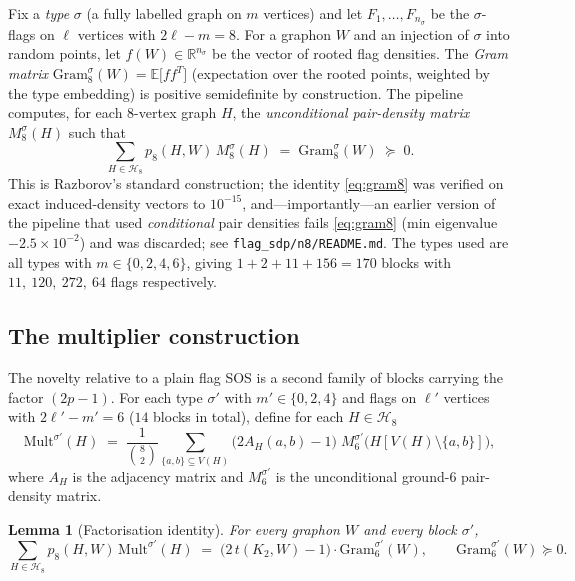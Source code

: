 \documentclass[11pt]{article}
\newtheorem{lemma}[theorem]{Lemma}
\theoremstyle{definition}
\newcommand{\R}{\mathbb R}
\newcommand{\E}{\mathbb E}
\begin{document}
Fix a \emph{type} $\sigma$ (a fully labelled graph on $m$ vertices) and let
$F_1,\dots,F_{n_\sigma}$ be the $\sigma$-flags on $\ell$ vertices with
$2\ell-m=8$.  For a graphon $W$ and an injection of $\sigma$ into random
points, let $f(W)\in\R^{n_\sigma}$ be the vector of rooted flag densities.
The \emph{Gram matrix} $\mathrm{Gram}_8^\sigma(W)=\E\big[f f^{T}\big]$
(expectation over the rooted points, weighted by the type embedding) is
positive semidefinite by construction.  The pipeline computes, for each
$8$-vertex graph $H$, the \emph{unconditional pair-density matrix}
$M^\sigma_8(H)$ such that
\begin{equation}\label{eq:gram8}
  \sum_{H\in\mathcal H_8}p_8(H,W)\,M^\sigma_8(H)\;=\;\mathrm{Gram}_8^\sigma(W)
  \;\succeq\;0 .
\end{equation}
This is Razborov's standard construction; the identity \eqref{eq:gram8} was
verified on exact induced-density vectors to $10^{-15}$, and---importantly---an
earlier version of the pipeline that used \emph{conditional} pair densities
fails \eqref{eq:gram8} (min eigenvalue $-2.5\times10^{-2}$) and was discarded;
see \texttt{flag\_sdp/n8/README.md}.  The types used are all types with
$m\in\{0,2,4,6\}$, giving $1+2+11+156=170$ blocks with
$11,\ 120,\ 272,\ 64$ flags respectively.

\subsection{The multiplier construction}\label{sec:mult}

The novelty relative to a plain flag SOS is a second family of blocks carrying
the factor $(2p-1)$.  For each type $\sigma'$ with $m'\in\{0,2,4\}$ and flags
on $\ell'$ vertices with $2\ell'-m'=6$ ($14$ blocks in total), define for each
$H\in\mathcal H_8$
\begin{equation}\label{eq:multdef}
  \mathrm{Mult}^{\sigma'}(H)\;=\;\frac1{\binom82}\sum_{\{a,b\}\subseteq V(H)}
  \big(2A_H(a,b)-1\big)\; M^{\sigma'}_{6}\!\big(H[V(H)\setminus\{a,b\}]\big),
\end{equation}
where $A_H$ is the adjacency matrix and $M^{\sigma'}_6$ is the unconditional
ground-$6$ pair-density matrix.

\begin{lemma}[Factorisation identity]\label{lem:fact}
For every graphon $W$ and every block $\sigma'$,
\[
  \sum_{H\in\mathcal H_8}p_8(H,W)\,\mathrm{Mult}^{\sigma'}(H)
  \;=\;\big(2\,t(K_2,W)-1\big)\cdot\mathrm{Gram}_6^{\sigma'}(W),
  \qquad \mathrm{Gram}_6^{\sigma'}(W)\succeq0 .
\]
\end{lemma}
\end{document}
